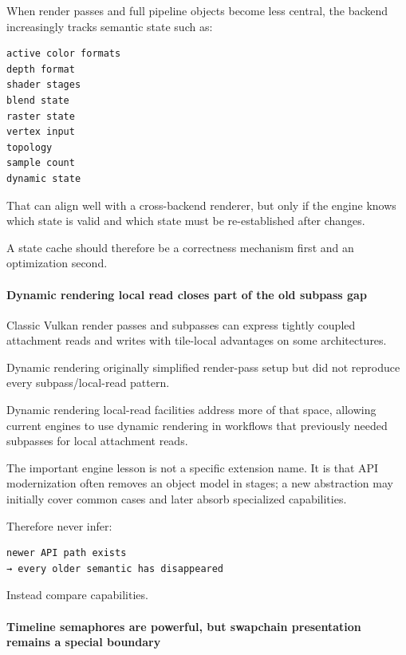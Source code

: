 When render passes and full pipeline objects become less central, the backend increasingly tracks semantic state such as:

\begin{verbatim}
active color formats
depth format
shader stages
blend state
raster state
vertex input
topology
sample count
dynamic state
\end{verbatim}

That can align well with a cross-backend renderer, but only if the engine knows which state is valid and which state must be re-established after changes.

A state cache should therefore be a correctness mechanism first and an optimization second.

\paragraph{Dynamic rendering local read closes part of the old subpass gap}\label{dynamic-rendering-local-read-closes-part-of-the-old-subpass-gap}

Classic Vulkan render passes and subpasses can express tightly coupled attachment reads and writes with tile-local advantages on some architectures.

Dynamic rendering originally simplified render-pass setup but did not reproduce every subpass/local-read pattern.

Dynamic rendering local-read facilities address more of that space, allowing current engines to use dynamic rendering in workflows that previously needed subpasses for local attachment reads.

The important engine lesson is not a specific extension name. It is that API modernization often removes an object model in stages; a new abstraction may initially cover common cases and later absorb specialized capabilities.

Therefore never infer:

\begin{verbatim}
newer API path exists
→ every older semantic has disappeared
\end{verbatim}

Instead compare capabilities.

\paragraph{Timeline semaphores are powerful, but swapchain presentation remains a special boundary}\label{timeline-semaphores-are-powerful-but-swapchain-presentation-remains-a-special-boundary}

